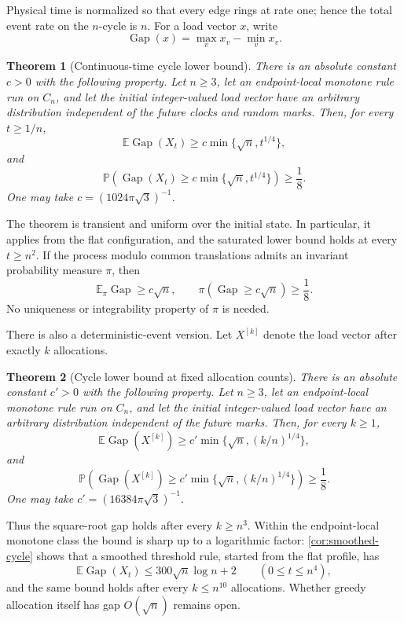 \documentclass[11pt]{article}
\newtheorem{theorem}{Theorem}[section]
\theoremstyle{remark}
\newcommand{\E}{\mathbb{E}}
\newcommand{\Pp}{\mathbb{P}}
\newcommand{\Gap}{\operatorname{Gap}}
\begin{document}
Physical time is normalized so that every edge rings at rate one; hence the total event rate on the $n$-cycle is $n$. For a load vector $x$, write
\[
 \Gap(x)=\max_v x_v-\min_v x_v.
\]

\begin{theorem}[Continuous-time cycle lower bound]\label{thm:intro-cycle}
There is an absolute constant $c>0$ with the following property. Let $n\ge3$, let an endpoint-local monotone rule run on $C_n$, and let the initial integer-valued load vector have an arbitrary distribution independent of the future clocks and random marks. Then, for every $t\ge1/n$,
\[
 \E\Gap(X_t)\ge c\min\{\sqrt n,t^{1/4}\},
\]
and
\[
 \Pp\!\left(\Gap(X_t)\ge c\min\{\sqrt n,t^{1/4}\}\right)\ge\frac18.
\]
One may take $c=(1024\pi\sqrt3)^{-1}$.
\end{theorem}

The theorem is transient and uniform over the initial state. In particular, it applies from the flat configuration, and the saturated lower bound holds at every $t\ge n^2$. If the process modulo common translations admits an invariant probability measure $\pi$, then
\[
 \E_\pi\Gap\ge c\sqrt n,
 \qquad
 \pi(\Gap\ge c\sqrt n)\ge\frac18.
\]
No uniqueness or integrability property of $\pi$ is needed.

There is also a deterministic-event version. Let $X^{[k]}$ denote the load vector after exactly $k$ allocations.

\begin{theorem}[Cycle lower bound at fixed allocation counts]\label{thm:intro-discrete}
There is an absolute constant $c'>0$ with the following property. Let $n\ge3$, let an endpoint-local monotone rule run on $C_n$, and let the initial integer-valued load vector have an arbitrary distribution independent of the future marks. Then, for every $k\ge1$,
\[
 \E\Gap(X^{[k]})\ge c'\min\{\sqrt n,(k/n)^{1/4}\},
\]
and
\[
 \Pp\!\left(\Gap(X^{[k]})\ge c'\min\{\sqrt n,(k/n)^{1/4}\}\right)\ge\frac18.
\]
One may take $c'=(16384\pi\sqrt3)^{-1}$.
\end{theorem}

Thus the square-root gap holds after every $k\ge n^3$. Within the endpoint-local monotone class the bound is sharp up to a logarithmic factor: \cref{cor:smoothed-cycle} shows that a smoothed threshold rule, started from the flat profile, has
\[
 \E\Gap(X_t)\le 300\sqrt n\log n+2
 \qquad(0\le t\le n^4),
\]
and the same bound holds after every $k\le n^{10}$ allocations. Whether greedy allocation itself has gap $O(\sqrt n)$ remains open.
\end{document}
